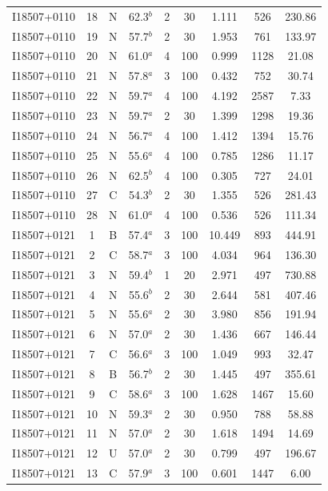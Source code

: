 \begin{table}
\begin{tabular}{ccccccccc}
I18507+0110 & 18 & N & 62.3$^{b}$ & 2 & 30 & 1.111 & 526 & 230.86 \\
I18507+0110 & 19 & N & 57.7$^{b}$ & 2 & 30 & 1.953 & 761 & 133.97 \\
I18507+0110 & 20 & N & 61.0$^{a}$ & 4 & 100 & 0.999 & 1128 & 21.08 \\
I18507+0110 & 21 & N & 57.8$^{a}$ & 3 & 100 & 0.432 & 752 & 30.74 \\
I18507+0110 & 22 & N & 59.7$^{a}$ & 4 & 100 & 4.192 & 2587 & 7.33 \\
I18507+0110 & 23 & N & 59.7$^{a}$ & 2 & 30 & 1.399 & 1298 & 19.36 \\
I18507+0110 & 24 & N & 56.7$^{a}$ & 4 & 100 & 1.412 & 1394 & 15.76 \\
I18507+0110 & 25 & N & 55.6$^{a}$ & 4 & 100 & 0.785 & 1286 & 11.17 \\
I18507+0110 & 26 & N & 62.5$^{b}$ & 4 & 100 & 0.305 & 727 & 24.01 \\
I18507+0110 & 27 & C & 54.3$^{b}$ & 2 & 30 & 1.355 & 526 & 281.43 \\
I18507+0110 & 28 & N & 61.0$^{a}$ & 4 & 100 & 0.536 & 526 & 111.34 \\
I18507+0121 & 1 & B & 57.4$^{a}$ & 3 & 100 & 10.449 & 893 & 444.91 \\
I18507+0121 & 2 & C & 58.7$^{a}$ & 3 & 100 & 4.034 & 964 & 136.30 \\
I18507+0121 & 3 & N & 59.4$^{b}$ & 1 & 20 & 2.971 & 497 & 730.88 \\
I18507+0121 & 4 & N & 55.6$^{b}$ & 2 & 30 & 2.644 & 581 & 407.46 \\
I18507+0121 & 5 & N & 55.6$^{a}$ & 2 & 30 & 3.980 & 856 & 191.94 \\
I18507+0121 & 6 & N & 57.0$^{a}$ & 2 & 30 & 1.436 & 667 & 146.44 \\
I18507+0121 & 7 & C & 56.6$^{a}$ & 3 & 100 & 1.049 & 993 & 32.47 \\
I18507+0121 & 8 & B & 56.7$^{b}$ & 2 & 30 & 1.445 & 497 & 355.61 \\
I18507+0121 & 9 & C & 58.6$^{a}$ & 3 & 100 & 1.628 & 1467 & 15.60 \\
I18507+0121 & 10 & N & 59.3$^{a}$ & 2 & 30 & 0.950 & 788 & 58.88 \\
I18507+0121 & 11 & N & 57.0$^{a}$ & 2 & 30 & 1.618 & 1494 & 14.69 \\
I18507+0121 & 12 & U & 57.0$^{a}$ & 2 & 30 & 0.799 & 497 & 196.67 \\
I18507+0121 & 13 & C & 57.9$^{a}$ & 3 & 100 & 0.601 & 1447 & 6.00 \\

\end{tabular}
\end{table}
